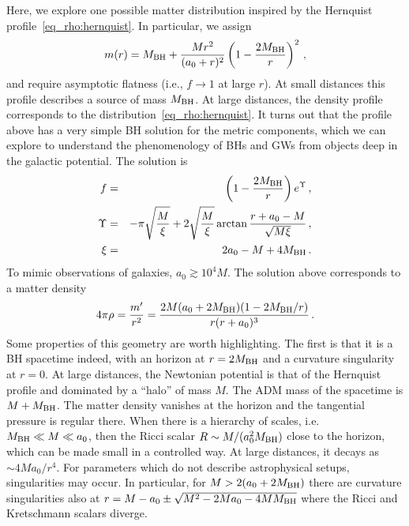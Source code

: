 \documentclass[twocolumn,preprintnumbers,nofootinbib,prd,superscriptaddress,aps]{revtex4-1}
\def\be{\begin{equation}}
\def\ee{\end{equation}}
\newcommand{\beq}{\begin{eqnarray}}
\newcommand{\eeq}{\end{eqnarray}}
\def\be{\begin{equation}}
\def\ee{\end{equation}}
\begin{document}
Here, we explore one possible matter distribution inspired by the Hernquist profile~\eqref{eq_rho:hernquist}. In particular, we assign
%
\be
m(r)=M_{\rm BH}+\frac{M r^2}{(a_0+r)^2}\left(1-\frac{2M_{\rm BH}}{r}\right)^2\,,
\ee
%
and require asymptotic flatness (i.e., $f\to 1$ at large $r$). At small distances this profile describes a source of mass $M_{\rm BH}$. At large distances,
the density profile corresponds to the distribution~\eqref{eq_rho:hernquist}.
It turns out that the profile above has a very simple BH solution for the metric components, which we can explore to understand the phenomenology of BHs and GWs from
objects deep in the galactic potential. The solution is
%
\beq
%
f&=&\left(1-\frac{2M_{\rm BH}}{r}\right)e^\Upsilon\,,\label{eq_fhairy}\\
%
\Upsilon&=&-\pi\sqrt{\frac{M}{\xi}}+2\sqrt{\frac{M}{\xi}}\arctan{\frac{r+a_0-M}{\sqrt{M\xi}}}\,,\\
%
\xi&=&2a_0-M+4M_{\rm BH}\,.%
%
\eeq
%
To mimic observations of galaxies, $a_0 \gtrsim 10^{4}M$. The solution above corresponds to a matter density
%
\be
4\pi \rho=\frac{m'}{r^2}=\frac{2M(a_0+2M_{\rm BH})(1-2M_{\rm BH}/r)}{r(r+a_0)^3}\,.\label{eq:hernquist_GR}
\ee
%
Some properties of this geometry are worth highlighting.
The first is that it is a BH spacetime indeed, with an horizon at $r=2M_{\rm BH}$ and a curvature singularity at $r=0$.
%
At large distances, the Newtonian potential is that of the Hernquist profile and dominated by a ``halo'' of mass $M$. The ADM mass of the spacetime is $M+M_{\rm BH}$.
%
The matter density vanishes at the horizon and the tangential pressure is regular there. 
%
When there is a hierarchy of scales, i.e. $M_{\rm BH}\ll M\ll a_0$, then the Ricci scalar $R\sim M/(a_0^2 M_{\rm BH})$ close to the horizon, which can be made small in a controlled way. At large distances, it decays as $\sim 4Ma_0/r^4$. 
For parameters which do not describe astrophysical setups, singularities may occur. In particular, for $M>2(a_0+2M_{\rm BH})$ there are curvature singularities also at $r=M-a_0 \pm\sqrt{M^2-2Ma_0-4MM_{\rm BH}}$ where the Ricci and Kretschmann scalars diverge.
%
\end{document}
